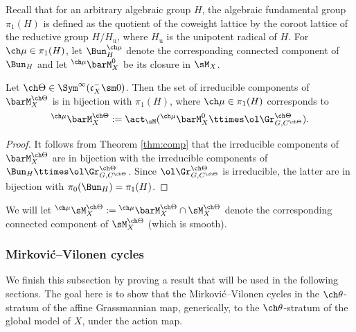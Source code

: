 \subsubsection{}
Recall that for an arbitrary algebraic group $H$, the algebraic fundamental
group $\pi_1(H)$ is defined as the quotient of the coweight lattice by the coroot lattice
of the reductive group $H/H_{\mathrm u}$, where $H_{\mathrm u}$ is the unipotent
radical of $H$.
For $\ch\mu\in \pi_1(H)$, let $\Bun_H^{\ch\mu}$ denote the
corresponding connected component of $\Bun_H$ and let $^{\ch\mu}\barM_X^0$
be its closure in $\sM_X$.

\begin{cor}
\notready \label{cor:strata-comp}
Let $\ch\Theta \in \Sym^\infty( \mathfrak c_X^- \sm 0)$.
Then the set of irreducible components of $\barM^{\ch\Theta}_X$ is in bijection
with $\pi_1(H)$, where $\ch\mu\in \pi_1(H)$ corresponds to
\[ ^{\ch\mu}\barM_X^{\ch\Theta} :=
\act_\sM(^{\ch\mu}\barM^0_X \ttimes \ol\Gr^{\ch\Theta}_{G,C^{\ch\Theta}}).
\]
\end{cor}

\begin{proof}
 It follows from Theorem \ref{thm:comp} that the irreducible
components of $\barM^{\ch\Theta}_X$ are in bijection with the
irreducible components of $\Bun_H \ttimes \ol\Gr^{\ch\Theta}_{G,C^{\ch\Theta}}$.
Since $\ol\Gr^{\ch\Theta}_{G,C^{\ch\Theta}}$ is irreducible, the
latter are in bijection with $\pi_0(\Bun_H) = \pi_1(H)$.
\end{proof}

We will let $^{\ch\mu}\sM_X^{\ch\Theta} := {^{\ch\mu}}\barM_X^{\ch\Theta} \cap \sM_X^{\ch\Theta}$
denote the corresponding connected component of $\sM_X^{\ch\Theta}$ (which is smooth).

\subsubsection{Mirkovi\'c--Vilonen cycles}

We finish this subsection by proving a result that will be used in the following sections. The goal here is to show that the Mirkovi\'c--Vilonen cycles in the $\ch\theta$-stratum of the affine Grassmannian map, generically, to the $\ch\theta$-stratum of the global model of $X$, under the action map.


